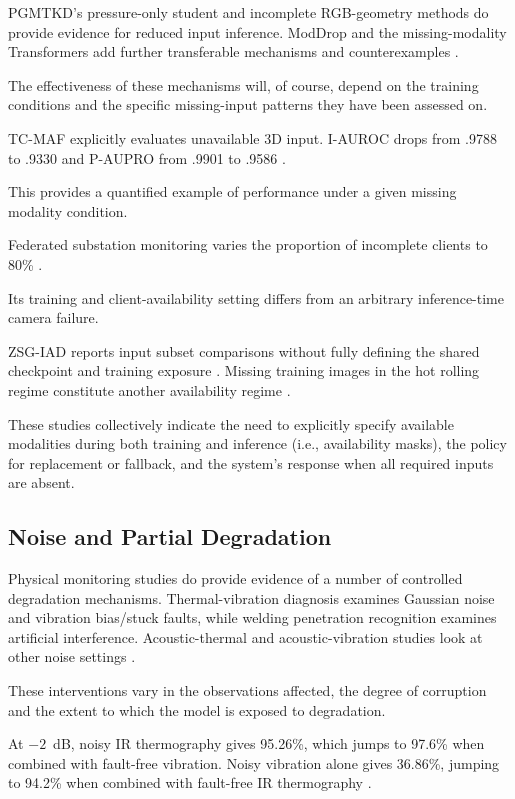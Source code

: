 PGMTKD's pressure-only student and incomplete RGB-geometry methods do provide evidence for reduced
input inference. ModDrop and the missing-modality Transformers add further transferable mechanisms
and counterexamples \parencite{Li2025PGMTKD,Sui2026Incomplete,P005,P016}.

The effectiveness of these mechanisms will, of course, depend on the training conditions and the
specific missing-input patterns they have been assessed on.

TC-MAF explicitly evaluates unavailable 3D input. I-AUROC drops from .9788 to .9330 and P-AUPRO from
.9901 to .9586 \parencite[PDF p.~7, Table~3]{P026}.

This provides a quantified example of performance under a given missing modality condition.

Federated substation monitoring varies the proportion of incomplete clients to 80\% \parencite[Figure~8]{P051}.

Its training and client-availability setting differs from an arbitrary inference-time camera
failure.

ZSG-IAD reports input subset comparisons without fully defining the shared checkpoint and training
exposure \parencite{P025}. Missing training images in the hot rolling regime constitute another
availability regime \parencite{Ma2025A}.

These studies collectively indicate the need to explicitly specify available modalities during both
training and inference (i.e., availability masks), the policy for replacement or fallback, and the
system's response when all required inputs are absent.

\subsection{Noise and Partial Degradation}

Physical monitoring studies do provide evidence of a number of controlled degradation mechanisms.
Thermal-vibration diagnosis examines Gaussian noise and vibration bias/stuck faults, while welding
penetration recognition examines artificial interference. Acoustic-thermal and acoustic-vibration
studies look at other noise settings
\parencite{Huo2022Multisensor,Hua2026Weld,Ying2025Trustworthy,Huang2026Rolling}.

These interventions vary in the observations affected, the degree of corruption and the extent to
which the model is exposed to degradation.

At $-2$~dB, noisy IR thermography gives 95.26\%, which jumps to 97.6\% when combined with fault-free
vibration. Noisy vibration alone gives 36.86\%, jumping to 94.2\% when combined with fault-free IR
thermography \parencite[Table~VIII]{Huo2022Multisensor}.

